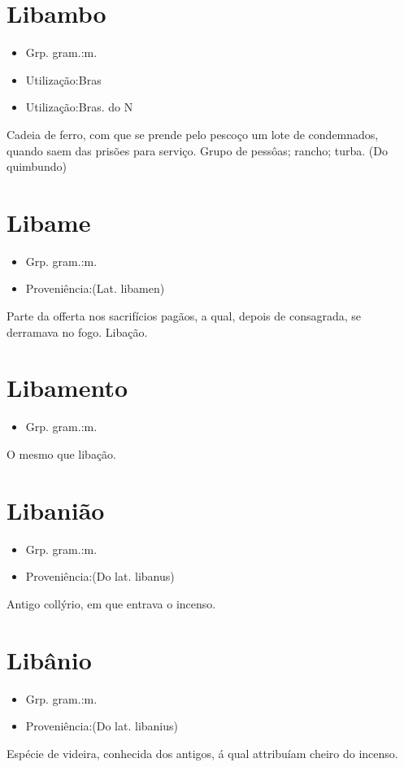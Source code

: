 \section{Libambo}
\begin{itemize}
\item {Grp. gram.:m.}
\end{itemize}
\begin{itemize}
\item {Utilização:Bras}
\end{itemize}
\begin{itemize}
\item {Utilização:Bras. do N}
\end{itemize}
Cadeia de ferro, com que se prende pelo pescoço um lote de condemnados, quando saem das prisões para serviço.
Grupo de pessôas; rancho; turba.
(Do quimbundo)
\section{Libame}
\begin{itemize}
\item {Grp. gram.:m.}
\end{itemize}
\begin{itemize}
\item {Proveniência:(Lat. \textunderscore libamen\textunderscore )}
\end{itemize}
Parte da offerta nos sacrifícios pagãos, a qual, depois de consagrada, se derramava no fogo.
Libação.
\section{Libamento}
\begin{itemize}
\item {Grp. gram.:m.}
\end{itemize}
O mesmo que \textunderscore libação\textunderscore .
\section{Libanião}
\begin{itemize}
\item {Grp. gram.:m.}
\end{itemize}
\begin{itemize}
\item {Proveniência:(Do lat. \textunderscore libanus\textunderscore )}
\end{itemize}
Antigo collýrio, em que entrava o incenso.
\section{Libânio}
\begin{itemize}
\item {Grp. gram.:m.}
\end{itemize}
\begin{itemize}
\item {Proveniência:(Do lat. \textunderscore libanius\textunderscore )}
\end{itemize}
Espécie de videira, conhecida dos antigos, á qual attribuíam cheiro do incenso.
